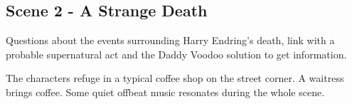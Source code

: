 \subsection{Scene 2 -  A Strange Death}

\begin{scene_summary}
Questions about the events surrounding Harry Endring's death, link with a
probable supernatural act and the Daddy Voodoo solution to get information.
\end{scene_summary}


\begin{location_description}
The characters refuge in a typical coffee shop on the street corner. A waitress
brings coffee. Some quiet offbeat music resonates during the whole scene.
\end{location_description}
